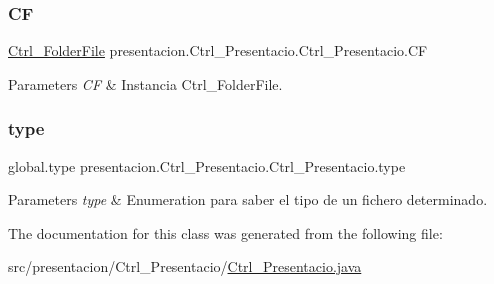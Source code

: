 \subsubsection{\texorpdfstring{CF}{CF}}
{\footnotesize\ttfamily \hyperlink{classdomini_1_1folders_1_1Ctrl__FolderFile}{Ctrl\+\_\+\+Folder\+File} presentacion.\+Ctrl\+\_\+\+Presentacio.\+Ctrl\+\_\+\+Presentacio.\+CF\hspace{0.3cm}{\ttfamily [package]}}


\begin{DoxyParams}{Parameters}
{\em CF} & Instancia Ctrl\+\_\+\+Folder\+File. \\
\hline
\end{DoxyParams}
\mbox{\label{classpresentacion_1_1Ctrl__Presentacio_1_1Ctrl__Presentacio_af72267ee1302df6b5982c3248d5a19b0}} 
\subsubsection{\texorpdfstring{type}{type}}
{\footnotesize\ttfamily global.\+type presentacion.\+Ctrl\+\_\+\+Presentacio.\+Ctrl\+\_\+\+Presentacio.\+type\hspace{0.3cm}{\ttfamily [private]}}


\begin{DoxyParams}{Parameters}
{\em type} & Enumeration para saber el tipo de un fichero determinado. \\
\hline
\end{DoxyParams}


The documentation for this class was generated from the following file\+:\begin{DoxyCompactItemize}
\item 
src/presentacion/\+Ctrl\+\_\+\+Presentacio/\hyperlink{Ctrl__Presentacio_8java}{Ctrl\+\_\+\+Presentacio.\+java}\end{DoxyCompactItemize}
